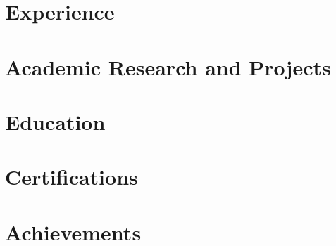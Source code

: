 \documentclass[letterpaper,11pt]{article}
\begin{document}
\setlength{\footskip}{4.08003pt}

% 





\section{Experience}
    \resumeSubHeadingListStart  
        
        
    \resumeSubHeadingListEnd

\section{Academic Research and Projects}
    \resumeSubHeadingListStart
        
        
    \resumeSubHeadingListEnd

\section{Education}
\resumeSubHeadingListStart
    
    
\resumeSubHeadingListEnd

\section{Certifications}
    \resumeSubHeadingListStart
        
        
        
                
    \resumeSubHeadingListEnd
    

\section{Achievements}
    \resumeSubHeadingListStart
        
        
    \resumeSubHeadingListEnd
\end{document}
